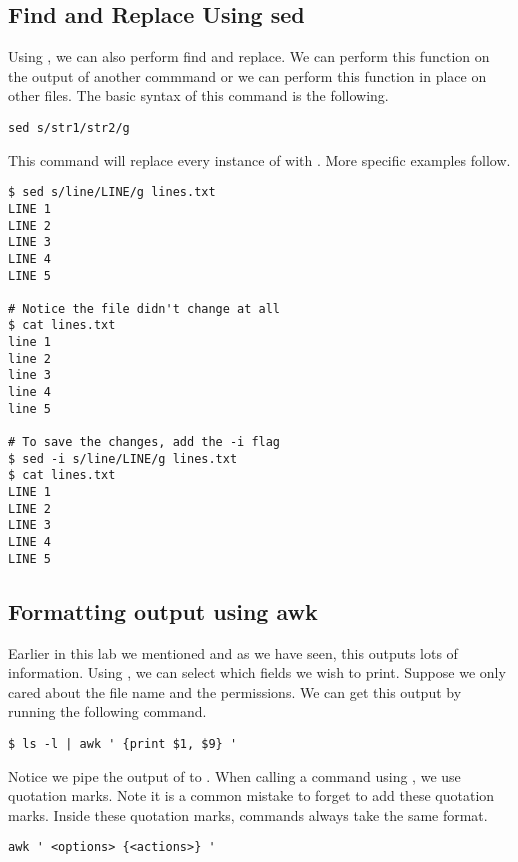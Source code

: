 \subsection*{Find and Replace Using sed} %

Using , we can also perform find and replace.
We can perform this function on the output of another commmand or we can perform this function in place on other files.
The basic syntax of this  command is the following.

\begin{lstlisting}
sed s/str1/str2/g
\end{lstlisting}

This command will replace every instance of  with . More specific examples follow.

\begin{lstlisting}
$ sed s/line/LINE/g lines.txt
LINE 1
LINE 2
LINE 3
LINE 4
LINE 5

# Notice the file didn't change at all
$ cat lines.txt
line 1
line 2
line 3
line 4
line 5

# To save the changes, add the -i flag
$ sed -i s/line/LINE/g lines.txt
$ cat lines.txt
LINE 1
LINE 2
LINE 3
LINE 4
LINE 5
\end{lstlisting}

\subsection*{Formatting output using awk} %

Earlier in this lab we mentioned  and as we have seen, this outputs lots of information.
Using , we can select which fields we wish to print.
Suppose we only cared about the file name and the permissions.
We can get this output by running the following command.

\begin{lstlisting}
$ ls -l | awk ' {print $1, $9} '
\end{lstlisting}

Notice we pipe the output of  to .
When calling a command using , we use quotation marks.
Note it is a common mistake to forget to add these quotation marks.
Inside these quotation marks, commands always take the same format.

\begin{lstlisting}
awk ' <options> {<actions>} '
\end{lstlisting}

